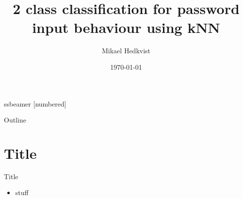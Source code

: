 ss{beamer}
%
%
%
{
[numbered]
}
\usepackage[english]{babel}
\usepackage[utf8x]{inputenc}
\usepackage{verbatim, hyperref, tabularx}
\title[D7041E miniproject]{2 class classification for password input behaviour using kNN}
\author{Mikael Hedkvist}
\date{\today}



\begin{frame}
\titlepage
\end{frame}

\begin{frame}{Outline}
\tableofcontents
\end{frame}

\section{Title}
\begin{frame}{Title}
	\begin{itemize}
		\item stuff
	\end{itemize}
\end{frame}


